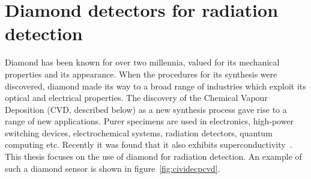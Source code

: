 
\chapter{Diamond detectors for radiation detection}
\label{ch:diamond}

%
%

Diamond has been known for over two millennia, valued for its mechanical properties and its appearance. When the procedures for its synthesis were discovered, diamond made its way to a broad range of industries which exploit its optical and electrical properties. The discovery of the Chemical Vapour Deposition (CVD, described below) as a new synthesis process gave rise to a range of new applications. Purer specimens are used in electronics, high-power switching devices, electrochemical systems, radiation detectors, quantum computing etc. Recently it was found that it also exhibits superconductivity~\cite{DIAMS:00000}. This thesis focuses on the use of diamond for radiation detection. An example of such a diamond sensor is shown in figure~\ref{fig:cividecpcvd}.


